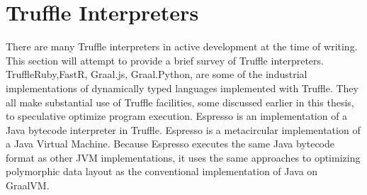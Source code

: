 \section{Truffle Interpreters}

There are many Truffle interpreters in active development at the time of writing.
This section will attempt to provide a brief survey of Truffle interpreters.
TruffleRuby\cite{trufflyruby:specialization}\cite{truffleruby:object-model},FastR, Graal.js, Graal.Python,\cite{truffle:thesis} are some of the industrial implementations of dynamically typed languages implemented with Truffle.
They all make substantial use of Truffle facilities, some discussed earlier in this thesis, to speculative optimize program execution. 
Espresso\cite{graalvm: espresso} is an implementation of a Java bytecode interpreter in Truffle. 
Espresso is a metacircular implementation of a Java Virtual Machine.
Because Espresso executes the same Java bytecode format as other JVM implementations, it uses the same approaches to optimizing polymorphic data layout as the conventional implementation of Java on GraalVM.


